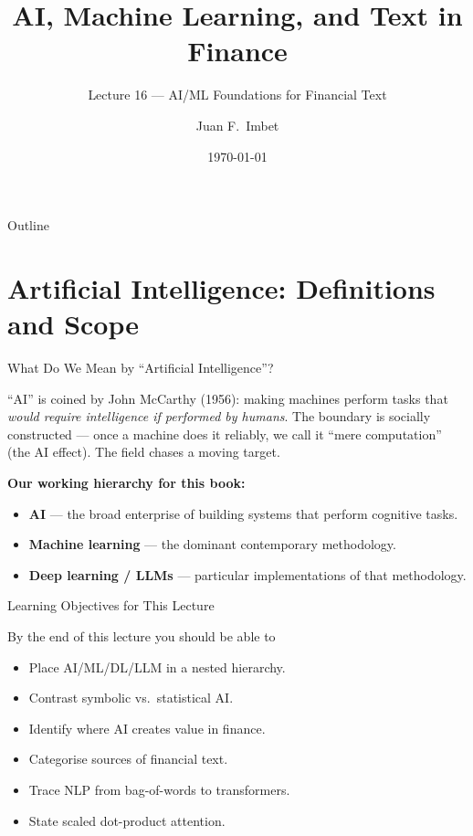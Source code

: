 \documentclass[9pt,t]{beamer}
\title{AI, Machine Learning, and Text in Finance}
\subtitle{Lecture 16 --- AI/ML Foundations for Financial Text}
\author{Juan F.\ Imbet}
\institute{Paris Dauphine -- PSL University}
\date{\today}
\begin{document}
\begin{frame}\titlepage\end{frame}

\begin{frame}{Outline}\tableofcontents\end{frame}

\section{Artificial Intelligence: Definitions and Scope}

\begin{frame}{What Do We Mean by ``Artificial Intelligence''?}

\begin{bigpicture}
``AI'' is coined by John McCarthy (1956): making machines perform tasks that
\emph{would require intelligence if performed by humans}. The boundary is
socially constructed --- once a machine does it reliably, we call it ``mere
computation'' (the \alert{AI effect}). The field chases a moving target.
\end{bigpicture}

\medskip
\textbf{Our working hierarchy for this book:}
\begin{itemize}
  \item \textbf{AI} --- the broad enterprise of building systems that perform cognitive tasks.
  \item \textbf{Machine learning} --- the dominant contemporary methodology.
  \item \textbf{Deep learning / LLMs} --- particular implementations of that methodology.
\end{itemize}
\end{frame}

\begin{frame}{Learning Objectives for This Lecture}

\begin{block}{By the end of this lecture you should be able to}
\begin{itemize}
  \item Place AI/ML/DL/LLM in a nested hierarchy.
  \item Contrast symbolic vs.\ statistical AI.
  \item Identify where AI creates value in finance.
  \item Categorise sources of financial text.
  \item Trace NLP from bag-of-words to transformers.
  \item State scaled dot-product attention.
\end{itemize}
\end{block}
\end{frame}
\end{document}
